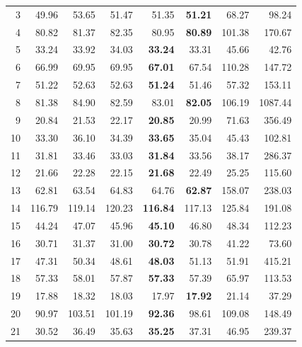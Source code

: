 \begin{table}[t]
\begin{tabular}{r r r r r r r r}
 3 & 49.96  & 53.65           & 51.47           & 51.35   & \textbf{51.21}  & 68.27   & 98.24  \\
 4 & 80.82  & 81.37           & 82.35           & 80.95   & \textbf{80.89}  & 101.38  & 170.67 \\
 5 & 33.24  & 33.92           & 34.03           & \textbf{33.24}  & 33.31   & 45.66   & 42.76  \\
 6 & 66.99  & 69.95           & 69.95           & \textbf{67.01}  & 67.54   & 110.28  & 147.72 \\
 7 & 51.22  & 52.63           & 52.63           & \textbf{51.24}  & 51.46   & 57.32   & 153.11 \\
 8 & 81.38  & 84.90           & 82.59           & 83.01   & \textbf{82.05}  & 106.19  & 1087.44 \\
 9 & 20.84  & 21.53           & 22.17           & \textbf{20.85}  & 20.99   & 71.63   & 356.49 \\
10 & 33.30  & 36.10           & 34.39           & \textbf{33.65}  & 35.04   & 45.43   & 102.81 \\
11 & 31.81  & 33.46           & 33.03           & \textbf{31.84}  & 33.56   & 38.17   & 286.37 \\
12 & 21.66  & 22.28           & 22.15           & \textbf{21.68}  & 22.49   & 25.25   & 115.60 \\
13 & 62.81  & 63.54           & 64.83           & 64.76   & \textbf{62.87}  & 158.07  & 238.03 \\
14 & 116.79 & 119.14          & 120.23          & \textbf{116.84} & 117.13  & 125.84  & 191.08 \\
15 & 44.24  & 47.07           & 45.96           & \textbf{45.10}  & 46.80   & 48.34   & 112.23 \\
16 & 30.71  & 31.37           & 31.00           & \textbf{30.72}  & 30.78   & 41.22   & 73.60  \\
17 & 47.31  & 50.34           & 48.61           & \textbf{48.03}  & 51.13   & 51.91   & 415.21 \\
18 & 57.33  & 58.01           & 57.87           & \textbf{57.33}  & 57.39   & 65.97   & 113.53 \\
19 & 17.88  & 18.32           & 18.03           & 17.97   & \textbf{17.92}  & 21.14   & 37.29  \\
20 & 90.97  & 103.51          & 101.19          & \textbf{92.36}  & 98.61   & 109.08  & 148.49 \\
21 & 30.52  & 36.49           & 35.63           & \textbf{35.25}  & 37.31   & 46.95   & 239.37 \\

\end{tabular}
\end{table}

